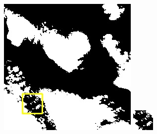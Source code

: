 \documentclass[10pt,UTF8,fntef]{ctexart}
\begin{document}
\begin{figure}[H]
{{\begin{minipage}[b]{0.15\linewidth}
            \includegraphics[width=1\linewidth]{../log/spoon3/cut/LC80290372013257LGN00_17086_my.jpg}\vspace{4pt}
            \includegraphics[width=1\linewidth]{../log/spoon3/cut/tmp_cut_LC80290372013257LGN00_17086_my.jpg}\vspace{4pt}

\end{minipage}}}
\end{figure}
\end{document}
